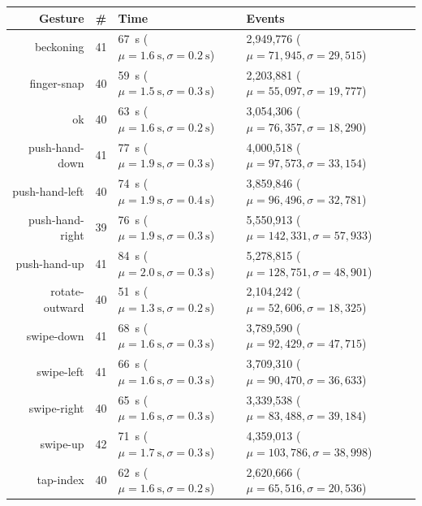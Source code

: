 \begin{table}
  \centering
  \begin{tabular}{r|c|l|l}
Gesture & \# & Time & Events\\
\hline
beckoning & 41 & \SI{67}{\second} (\(\mu = \SI{1.6}{\second}, \sigma = \SI{0.2}{\second}\)) & 2,949,776 (\(\mu = 71,945, \sigma = 29,515\))\\
finger-snap & 40 & \SI{59}{\second} (\(\mu = \SI{1.5}{\second}, \sigma = \SI{0.3}{\second}\)) & 2,203,881 (\(\mu = 55,097, \sigma = 19,777\))\\
ok & 40 & \SI{63}{\second} (\(\mu = \SI{1.6}{\second}, \sigma = \SI{0.2}{\second}\)) & 3,054,306 (\(\mu = 76,357, \sigma = 18,290\))\\
push-hand-down & 41 & \SI{77}{\second} (\(\mu = \SI{1.9}{\second}, \sigma = \SI{0.3}{\second}\)) & 4,000,518 (\(\mu = 97,573, \sigma = 33,154\))\\
push-hand-left & 40 & \SI{74}{\second} (\(\mu = \SI{1.9}{\second}, \sigma = \SI{0.4}{\second}\)) & 3,859,846 (\(\mu = 96,496, \sigma = 32,781\))\\
push-hand-right & 39 & \SI{76}{\second} (\(\mu = \SI{1.9}{\second}, \sigma = \SI{0.3}{\second}\)) & 5,550,913 (\(\mu = 142,331, \sigma = 57,933\))\\
push-hand-up & 41 & \SI{84}{\second} (\(\mu = \SI{2.0}{\second}, \sigma = \SI{0.3}{\second}\)) & 5,278,815 (\(\mu = 128,751, \sigma = 48,901\))\\
rotate-outward & 40 & \SI{51}{\second} (\(\mu = \SI{1.3}{\second}, \sigma = \SI{0.2}{\second}\)) & 2,104,242 (\(\mu = 52,606, \sigma = 18,325\))\\
swipe-down & 41 & \SI{68}{\second} (\(\mu = \SI{1.6}{\second}, \sigma = \SI{0.3}{\second}\)) & 3,789,590 (\(\mu = 92,429, \sigma = 47,715\))\\
swipe-left & 41 & \SI{66}{\second} (\(\mu = \SI{1.6}{\second}, \sigma = \SI{0.3}{\second}\)) & 3,709,310 (\(\mu = 90,470, \sigma = 36,633\))\\
swipe-right & 40 & \SI{65}{\second} (\(\mu = \SI{1.6}{\second}, \sigma = \SI{0.3}{\second}\)) & 3,339,538 (\(\mu = 83,488, \sigma = 39,184\))\\
swipe-up & 42 & \SI{71}{\second} (\(\mu = \SI{1.7}{\second}, \sigma = \SI{0.3}{\second}\)) & 4,359,013 (\(\mu = 103,786, \sigma = 38,998\))\\
tap-index & 40 & \SI{62}{\second} (\(\mu = \SI{1.6}{\second}, \sigma = \SI{0.2}{\second}\)) & 2,620,666 (\(\mu = 65,516, \sigma = 20,536\))\\

\end{tabular}
\end{table}
